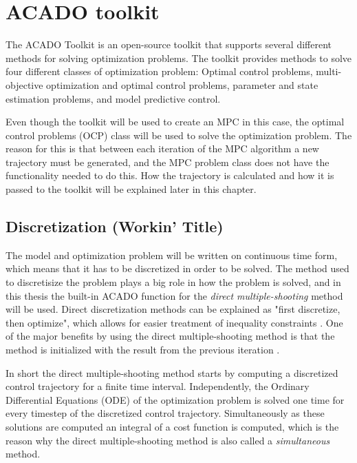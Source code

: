 \section{ACADO toolkit}

The ACADO Toolkit \cite{acadoHOUSKA} is an open-source toolkit that supports several different methods for solving optimization problems. The toolkit provides methods to solve four different classes of optimization problem: Optimal control problems, multi-objective optimization and optimal control problems, parameter and state estimation problems, and model predictive control.

Even though the toolkit will be used to create an MPC in this case, the optimal control problems (OCP) class will be used to solve the optimization problem. The reason for this is that between each iteration of the MPC algorithm a new trajectory must be generated, and the MPC problem class does not have the functionality needed to do this. How the trajectory is calculated and how it is passed to the toolkit will be explained later in this chapter.



\subsection{Discretization (Workin' Title)}

The model and optimization problem will be written on continuous time form, which means that it has to be discretized in order to be solved. The method used to discretisize the problem plays a big role in how the problem is solved, and in this thesis the built-in ACADO function for the \textit{direct multiple-shooting} method will be used. Direct discretization methods can be explained as "first discretize, then optimize", which allows for easier treatment of inequality constraints \cite{discDIEHL}. One of the major benefits by using the direct multiple-shooting method is that the method is initialized with the result from the previous iteration \cite{stallMATHISEN}.

In short the direct multiple-shooting method starts by computing a discretized control trajectory for a finite time interval. Independently, the Ordinary Differential Equations (ODE) of the optimization problem is solved one time for every timestep of the discretized control trajectory. Simultaneously as these solutions are computed an integral of a cost function is computed, which is the reason why the direct multiple-shooting method is also called a \textit{simultaneous} method. 

